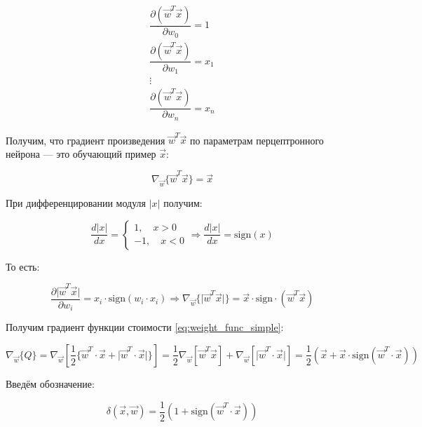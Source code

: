 \documentclass{article}
\numberwithin{equation}{subsection}
\begin{document}
\begin{align*}
    \dfrac{\partial \left( \vec{w}^T \vec{x} \right)}{\partial w_0} = 1 \\
    \dfrac{\partial \left( \vec{w}^T \vec{x} \right)}{\partial w_1} = x_1 \\
    \vdots \\
    \dfrac{\partial \left( \vec{w}^T \vec{x} \right)}{\partial w_n} = x_n
\end{align*}

Получим, что градиент произведения $\vec{w}^T \vec{x}$ по параметрам перцептронного
нейрона --- это обучающий пример $\vec{x}$:

\begin{equation}
    \nabla_{\vec{w}} \{\vec{w}^T \vec{x} \} = \vec{x}
\end{equation}

При дифференцировании модуля $\lvert x \rvert$ получим:

\begin{equation}
    \dfrac{d\lvert x \rvert}{dx} =
    \begin{cases}
        1, \quad x>0 \\
        -1, \quad x<0
    \end{cases}
    \Rightarrow \dfrac{d\lvert x \rvert}{dx} = \mathrm{sign} (x)
\end{equation}

То есть:

\begin{equation}
    \dfrac{\partial \lvert \vec{w}^T \vec{x} \rvert}{\partial w_i} = x_i \cdot \mathrm{sign} (w_i \cdot x_i)
    \Rightarrow \nabla_{\vec{w}} \{\lvert \vec{w}^T \vec{x} \rvert\} = \vec{x} \cdot \mathrm{sign} \cdot (\vec{w}^T \vec{x})
\end{equation}

Получим градиент функции стоимости \ref{eq:weight_func_simple}:

\begin{equation}
    \nabla_{\vec{w}} \{Q\} = \nabla_{\vec{w}} \left[\dfrac{1}{2} \{ \vec{w}^T \cdot \vec{x} + 
    \lvert \vec{w}^T \cdot \vec{x}  \rvert \} \right] 
    = \dfrac{1}{2}  \nabla_{\vec{w}} \left[ \vec{w}^T \vec{x} \right] + 
    \nabla_{\vec{w}} \left[ \lvert \vec{w}^T \cdot \vec{x}  \rvert \right]
    = \dfrac{1}{2} \left(\vec{x} + \vec{x} \cdot \mathrm{sign} (\vec{w}^T \cdot \vec{x})\right)
\end{equation}

Введём обозначение:

\begin{equation}
    \delta (\vec{x}, \vec{w}) = \dfrac{1}{2} \left( 1 + \mathrm{sign} (\vec{w}^T \cdot \vec{x}) \right)
\end{equation}
\end{document}
